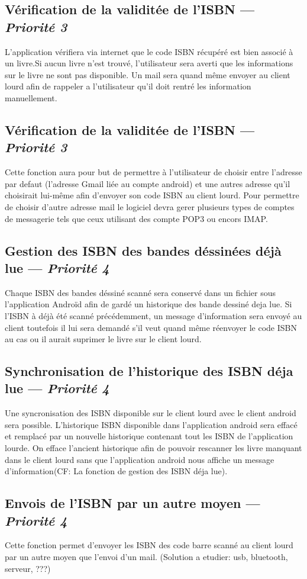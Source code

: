 
\subsection[Vérification de la validitée de l'ISBN]{Vérification de la validitée de l'ISBN — \emph{Priorité 3}}
L'application vérifiera via internet que le code ISBN récupéré est bien associé à un livre.Si aucun livre n'est trouvé, l'utilisateur sera averti que les informations sur le livre ne sont pas disponible. Un mail sera quand même envoyer au client lourd afin de rappeler a l'utilisateur qu'il doit rentré les information manuellement.
 
\subsection[Envois du mail contenant l'ISBN via une autre adresse mail]{Vérification de la validitée de l'ISBN — \emph{Priorité 3}}
Cette fonction aura pour but de permettre à l'utilisateur de choisir entre l'adresse par defaut (l'adresse Gmail liée au compte android) et une autres adresse qu'il choisirait lui-même afin d'envoyer son code ISBN au client lourd. Pour permettre de choisir d'autre adresse mail le logiciel devra gerer plusieurs types de comptes de messagerie tels que ceux utilisant des compte POP3 ou encors IMAP.


\subsection[Gestion des ISBN des bandes déssinées déjà lue]{Gestion des ISBN des bandes déssinées déjà lue — \emph{Priorité 4}}
Chaque ISBN des bandes déssiné scanné sera conservé dans un fichier sous l'application Androïd afin de gardé un historique des bande dessiné deja lue. Si l'ISBN à déjà été scanné précédemment, un message d'information sera envoyé au client toutefois il lui sera demandé s'il veut quand même réenvoyer le code ISBN au cas ou il aurait suprimer le livre sur le client lourd. 

\subsection[Synchronisation de l'historique des ISBN déja lue]{Synchronisation de l'historique des ISBN déja lue — \emph{Priorité 4}}
Une syncronisation des ISBN disponible sur le client lourd avec le client android sera possible. L'historique ISBN disponible dans l'application android sera effacé et remplacé par un nouvelle historique contenant tout les ISBN de l'application lourde. On efface l'ancient historique afin de pouvoir rescanner les livre manquant dans le client lourd sans que l'application android nous affiche un message d'information(CF: La fonction de gestion des ISBN déja lue).

\subsection[Envois de l'ISBN par un autre moyen]{Envois de l'ISBN par un autre moyen — \emph{Priorité 4}}
Cette fonction permet d'envoyer les ISBN des code barre scanné au client lourd par un autre moyen que l'envoi d'un mail. (Solution a etudier: usb, bluetooth, serveur, ???)